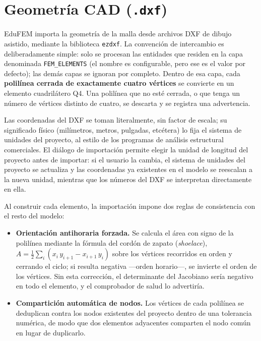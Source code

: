 \section{Geometría CAD (\texttt{.dxf})}

EduFEM importa la geometría de la malla desde archivos DXF de dibujo asistido, mediante la biblioteca \texttt{ezdxf}. La convención de intercambio es deliberadamente simple: solo se procesan las entidades que residen en la capa denominada \texttt{FEM\_ELEMENTS} (el nombre es configurable, pero ese es el valor por defecto); las demás capas se ignoran por completo. Dentro de esa capa, cada \textbf{polilínea cerrada de exactamente cuatro vértices} se convierte en un elemento cuadrilátero Q4. Una polilínea que no esté cerrada, o que tenga un número de vértices distinto de cuatro, se descarta y se registra una advertencia.

Las coordenadas del DXF se toman literalmente, sin factor de escala; su significado físico (milímetros, metros, pulgadas, etcétera) lo fija el sistema de unidades del proyecto, al estilo de los programas de análisis estructural comerciales. El diálogo de importación permite elegir la unidad de longitud del proyecto antes de importar: si el usuario la cambia, el sistema de unidades del proyecto se actualiza y las coordenadas ya existentes en el modelo se reescalan a la nueva unidad, mientras que los números del DXF se interpretan directamente en ella.

Al construir cada elemento, la importación impone dos reglas de consistencia con el resto del modelo:

\begin{itemize}
  \item \textbf{Orientación antihoraria forzada.} Se calcula el área con signo de la polilínea mediante la fórmula del cordón de zapato (\emph{shoelace}), $A = \tfrac{1}{2}\sum_i (x_i\,y_{i+1} - x_{i+1}\,y_i)$ sobre los vértices recorridos en orden y cerrando el ciclo; si resulta negativa ---orden horario---, se invierte el orden de los vértices. Sin esta corrección, el determinante del Jacobiano sería negativo en todo el elemento, y el comprobador de salud lo advertiría.
  \item \textbf{Compartición automática de nodos.} Los vértices de cada polilínea se deduplican contra los nodos existentes del proyecto dentro de una tolerancia numérica, de modo que dos elementos adyacentes comparten el nodo común en lugar de duplicarlo.
\end{itemize}

